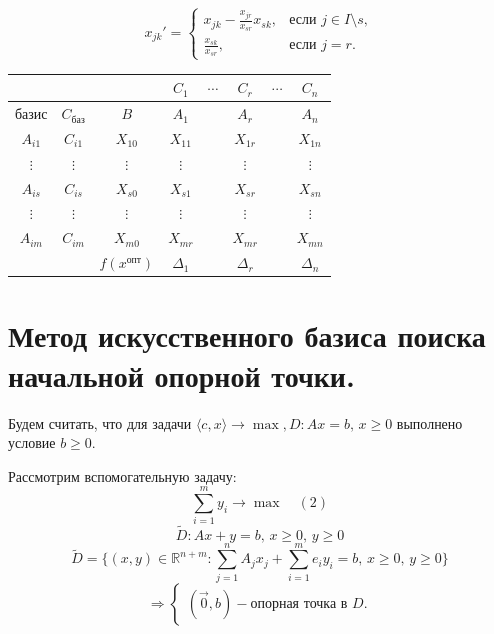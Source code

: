 \documentclass[17pt]{extarticle}
\begin{document}
\[
    x_{jk}' =
    \begin{cases}
        x_{jk} - \frac{x_{jr}}{x_{sr}} x_{sk}, & \text{если } j \in I \setminus s, \\
        \frac{x_{sk}}{x_{sr}},                 & \text{если } j = r.
    \end{cases}
\]

\begin{tabular}{|c|c|c|c|c|c|c|c|}
    \hline
                 &                      &                         & \( C_1 \)      & \(\cdots\) & \( C_r \)      & \(\cdots\) & \( C_n \)      \\
    \hline
    базис        & \( C_{\text{баз}} \) & \( B \)                 & \( A_1 \)      &            & \( A_r \)      &            & \( A_n \)      \\
    \hline
    \( A_{i1} \) & \( C_{i1} \)         & \( X_{10} \)            & \( X_{11} \)   &            & \( X_{1r} \)   &            & \( X_{1n} \)   \\
    \hline
    \(\vdots\)   & \(\vdots\)           & \(\vdots\)              & \(\vdots\)     &            & \(\vdots\)     &            & \(\vdots\)     \\
    \hline
    \( A_{is} \) & \( C_{is} \)         & \( X_{s0} \)            & \( X_{s1} \)   &            & \( X_{sr} \)   &            & \( X_{sn} \)   \\
    \hline
    \(\vdots\)   & \(\vdots\)           & \(\vdots\)              & \(\vdots\)     &            & \(\vdots\)     &            & \(\vdots\)     \\
    \hline
    \( A_{im} \) & \( C_{im} \)         & \( X_{m0} \)            & \( X_{mr} \)   &            & \( X_{mr} \)   &            & \( X_{mn} \)   \\
    \hline
                 &                      & \( f(x^{\text{опт}}) \) & \( \Delta_1 \) &            & \( \Delta_r \) &            & \( \Delta_n \) \\
    \hline
\end{tabular}


\section{Метод искусственного базиса поиска \\ начальной опорной точки.}
Будем считать, что для задачи
\(
\langle c, x \rangle \rightarrow \max, D: Ax = b, \, x \geq 0
\)
выполнено условие \( b \geq 0 \).

Рассмотрим вспомогательную задачу:
\[
    \sum_{i=1}^m y_i \rightarrow \max \quad (2)
\]
\[
    \tilde{D}: Ax + y = b, \, x \geq 0, \, y \geq 0
\]
\[
    \tilde{D} = \biggl\{(x, y) \in \mathbb{R}^{n+m} : \sum_{j=1}^n A_j x_j + \sum_{i=1}^m e_i y_i = b, \, x \geq 0, \, y \geq 0\biggr\}
\]
\[
    \Rightarrow
    \begin{cases}
        (\vec{0}, b) - \text{опорная точка в } D.
    \end{cases}
\]
\end{document}
